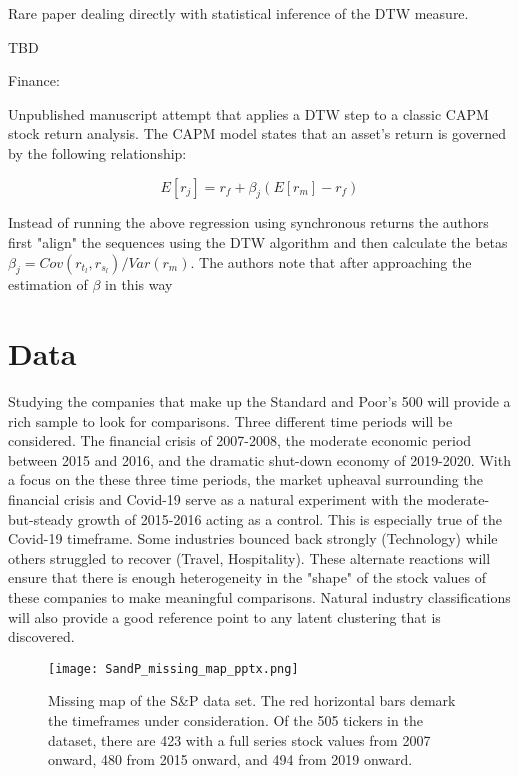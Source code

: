 \documentclass[12pt]{article}
\begin{document}
\parencite{DuyTakeuchi2023statistical} Rare paper dealing directly with statistical inference of the DTW measure.

\parencite{WangXieHanSun2012} TBD

Finance:

\parencite{HowardTalisAlexeev_2020} Unpublished manuscript attempt that applies a DTW step to a classic CAPM stock return analysis. The CAPM model states that an asset's return is governed by the following relationship:

\begin{equation}
    E[r_{j}] = r_{f} + \beta_{j} (E[r_{m}] - r_{f})
\end{equation}

Instead of running the above regression using  synchronous returns the authors first "align" the sequences using the DTW algorithm and then calculate the betas $\beta_{j} = Cov(r_{t_{l}}, r_{s_{l}}) / Var(r_{m})$. The authors note that after approaching the estimation of $\beta$ in this way

\section{Data}

Studying the companies that make up the Standard and Poor's 500 will provide a rich sample to look for comparisons. Three different time periods will be considered. The financial crisis of 2007-2008, the moderate economic period between 2015 and 2016, and the dramatic shut-down economy of 2019-2020. With a focus on the these three time periods, the market upheaval surrounding the financial crisis and Covid-19 serve as a natural experiment with the moderate-but-steady growth of 2015-2016 acting as a control. This is especially true of the Covid-19 timeframe. Some industries bounced back strongly (Technology) while others struggled to recover (Travel, Hospitality). These alternate reactions will ensure that there is enough heterogeneity in the "shape" of the stock values of these companies to make meaningful comparisons. Natural industry classifications will also provide a good reference point to any latent clustering that is discovered.

\begin{figure}
    \centering
    \texttt{[image: SandP\_missing\_map\_pptx.png]}
    \caption{Missing map of the S\&P data set. The red horizontal bars demark the timeframes under consideration. Of the 505 tickers in the dataset, there are 423 with a full series stock values from 2007 onward, 480 from 2015 onward, and 494 from 2019 onward.}
    \label{fig:SandP_missing_map}
\end{figure}
\end{document}
